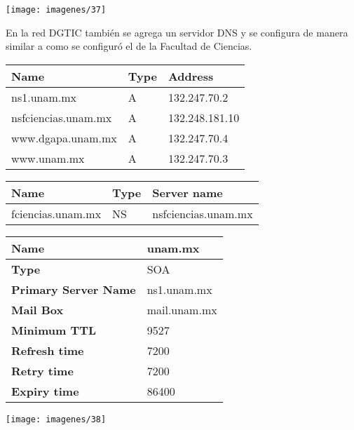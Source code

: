 \documentclass{article}
\begin{document}
\begin{center}
\texttt{[image: imagenes/37]}
\end{center}

En la red DGTIC también se agrega un servidor DNS y se configura de manera similar a como se configuró el de la Facultad de Ciencias.

\begin{center}
\begin{tabular}{|l|l|l|}
\hline
\textbf{Name} & \textbf{Type} & \textbf{Address} \\ \hline
ns1.unam.mx & A & 132.247.70.2 \\ \hline
nsfciencias.unam.mx & A & 132.248.181.10 \\ \hline
www.dgapa.unam.mx & A & 132.247.70.4 \\ \hline
www.unam.mx & A & 132.247.70.3 \\ \hline
\end{tabular}
\end{center}

\begin{center}
\begin{tabular}{|l|l|l|}
\hline
\textbf{Name} & \textbf{Type} & \textbf{Server name} \\ \hline
fciencias.unam.mx & NS & nsfciencias.unam.mx \\ \hline
\end{tabular}
\end{center}

\begin{center}
\begin{tabular}{|l|l|}
\hline
\textbf{Name} & unam.mx \\ \hline
\textbf{Type} & SOA \\ \hline
\textbf{Primary Server Name} & ns1.unam.mx \\ \hline
\textbf{Mail Box} & mail.unam.mx \\ \hline
\textbf{Minimum TTL} & 9527 \\ \hline
\textbf{Refresh time} & 7200 \\ \hline
\textbf{Retry time} & 7200 \\ \hline
\textbf{Expiry time} & 86400 \\ \hline
\end{tabular}
\end{center}

\begin{center}
\texttt{[image: imagenes/38]}
\end{center}
\end{document}
